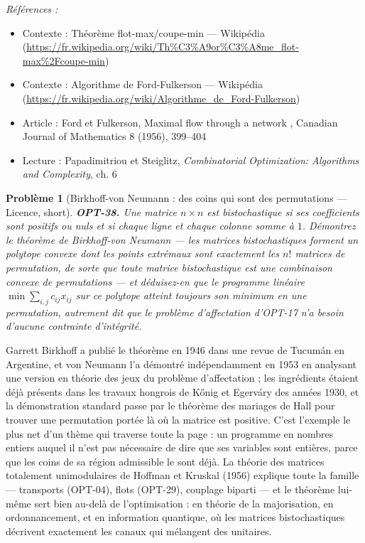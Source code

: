 \documentclass[11pt]{article}
\newtheorem{problem}{Problème}
\newenvironment{refs}{\par\small\noindent\emph{Références :}\begin{itemize}\setlength\itemsep{0pt}}{\end{itemize}\normalsize}
\begin{document}
\begin{refs}
\item Contexte : Théorème flot-max/coupe-min --- Wikipédia (\url{https://fr.wikipedia.org/wiki/Th%C3%A9or%C3%A8me_flot-max%2Fcoupe-min})
\item Contexte : Algorithme de Ford-Fulkerson --- Wikipédia (\url{https://fr.wikipedia.org/wiki/Algorithme_de_Ford-Fulkerson})
\item Article : Ford et Fulkerson, \og{} Maximal flow through a network \fg{}, Canadian Journal of Mathematics 8 (1956), 399--404
\item Lecture : Papadimitriou et Steiglitz, \textit{Combinatorial Optimization: Algorithms and Complexity}, ch. 6
\end{refs}

\bigskip

\begin{problem}[{Birkhoff-von Neumann : des coins qui sont des permutations --- Licence, short}]
\textbf{OPT-38.} Une matrice $n \times n$ est \textit{bistochastique} si ses coefficients sont positifs ou nuls et si chaque ligne et chaque colonne somme à $1$. Démontrez le théorème de Birkhoff-von Neumann --- les matrices bistochastiques forment un polytope convexe dont les points extrémaux sont exactement les $n!$ matrices de permutation, de sorte que toute matrice bistochastique est une combinaison convexe de permutations --- et déduisez-en que le programme linéaire $\min \sum_{i,j} c_{ij}x_{ij}$ sur ce polytope atteint toujours son minimum en une permutation, autrement dit que le problème d'affectation d'OPT-17 n'a besoin d'aucune contrainte d'intégrité.
\end{problem}

\noindent Garrett Birkhoff a publié le théorème en 1946 dans une revue de Tucumán en Argentine, et von Neumann l'a démontré indépendamment en 1953 en analysant une version en théorie des jeux du problème d'affectation ; les ingrédients étaient déjà présents dans les travaux hongrois de K\H{o}nig et Egerváry des années 1930, et la démonstration standard passe par le théorème des mariages de Hall pour trouver une permutation portée là où la matrice est positive. C'est l'exemple le plus net d'un thème qui traverse toute la page : un programme en nombres entiers auquel il n'est pas nécessaire de dire que ses variables sont entières, parce que les coins de sa région admissible le sont déjà. La théorie des matrices totalement unimodulaires de Hoffman et Kruskal (1956) explique toute la famille --- transports (OPT-04), flots (OPT-29), couplage biparti --- et le théorème lui-même sert bien au-delà de l'optimisation : en théorie de la majorisation, en ordonnancement, et en information quantique, où les matrices bistochastiques décrivent exactement les canaux qui mélangent des unitaires.
\end{document}
